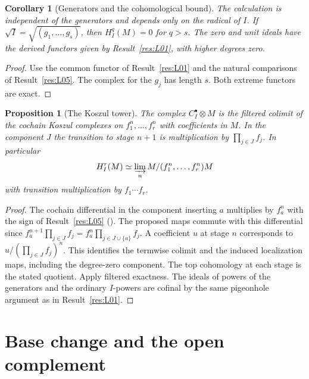 \documentclass[11pt,oneside,openany]{book}
\newtheorem{proposition}[theorem]{Proposition}
\newtheorem{corollary}[theorem]{Corollary}
\theoremstyle{definition}
\theoremstyle{remark}
\begin{document}
\begin{corollary}[Generators and the cohomological bound]\label{res:L06}
The calculation is independent of the generators and depends only on
the radical of \(I\). If \(\sqrt I=\sqrt{(g_1,\ldots,g_s)}\), then
\(H_I^q(M)=0\) for \(q>s\). The zero and unit ideals have the derived
functors given by Result~\ref{res:L01}, with higher degrees zero.
\end{corollary}
\begin{proof}
Use the common functor of Result~\ref{res:L01} and the natural
comparisons of Result~\ref{res:L05}. The complex for the \(g_j\) has
length \(s\). Both extreme functors are exact.
\end{proof}

\begin{proposition}[The Koszul tower]\label{res:L07}
The complex \(C_I^\bullet\otimes M\) is the filtered colimit of the
cochain Koszul complexes on \(f_1^n,\ldots,f_r^n\) with coefficients in
\(M\). In the component \(J\) the transition to stage \(n+1\) is
multiplication by \(\prod_{j\in J}f_j\). In particular
\[
 H_I^r(M)\simeq
 \varinjlim_n M/(f_1^n,\ldots,f_r^n)M
\]
with transition multiplication by \(f_1\cdots f_r\).
\end{proposition}
\begin{proof}
The cochain differential in the component inserting \(a\) multiplies
by \(f_a^n\) with the sign of Result~\ref{res:L05}
(\cite[RK-03 and RK-10]{core}). The proposed maps commute with this
differential since \(f_a^{n+1}\prod_{j\in J}f_j
=f_a^n\prod_{j\in J\cup\{a\}}f_j\). A coefficient \(u\) at stage \(n\)
corresponds to \(u/(\prod_{j\in J}f_j)^n\). This identifies the
termwise colimit and the induced localization maps, including the
degree-zero component. The top cohomology at each stage is the stated
quotient. Apply filtered exactness. The ideals of powers of the
generators and the ordinary \(I\)-powers are cofinal by the same
pigeonhole argument as in Result~\ref{res:L01}.
\end{proof}

\section{Base change and the open complement}
\end{document}
